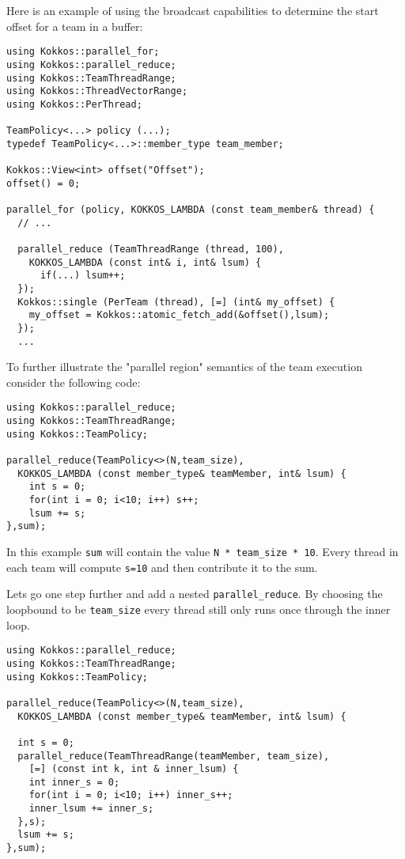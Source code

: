 Here is an example of using the broadcast capabilities to determine the start offset for a team
in a buffer:

\begin{lstlisting}
using Kokkos::parallel_for;
using Kokkos::parallel_reduce;
using Kokkos::TeamThreadRange;
using Kokkos::ThreadVectorRange;
using Kokkos::PerThread;

TeamPolicy<...> policy (...);
typedef TeamPolicy<...>::member_type team_member;

Kokkos::View<int> offset("Offset");
offset() = 0;

parallel_for (policy, KOKKOS_LAMBDA (const team_member& thread) {
  // ...

  parallel_reduce (TeamThreadRange (thread, 100),
    KOKKOS_LAMBDA (const int& i, int& lsum) {
      if(...) lsum++;
  });
  Kokkos::single (PerTeam (thread), [=] (int& my_offset) {
    my_offset = Kokkos::atomic_fetch_add(&offset(),lsum);
  });
  ...
\end{lstlisting}

To further illustrate the "parallel region" semantics of the team execution consider the following code:

\begin{lstlisting}
using Kokkos::parallel_reduce;
using Kokkos::TeamThreadRange;
using Kokkos::TeamPolicy;

parallel_reduce(TeamPolicy<>(N,team_size),
  KOKKOS_LAMBDA (const member_type& teamMember, int& lsum) {
    int s = 0;
    for(int i = 0; i<10; i++) s++;
    lsum += s;
},sum);
\end{lstlisting}

In this example \lstinline{sum} will contain the value \lstinline{N * team_size * 10}.
Every thread in each team will compute \lstinline{s=10} and then contribute it to the sum. 

Lets go one step further and add a nested \lstinline{parallel_reduce}. 
By choosing the loopbound to be \lstinline{team_size} every thread still only runs
once through the inner loop. 

\begin{lstlisting}
using Kokkos::parallel_reduce;
using Kokkos::TeamThreadRange;
using Kokkos::TeamPolicy;
  
parallel_reduce(TeamPolicy<>(N,team_size),
  KOKKOS_LAMBDA (const member_type& teamMember, int& lsum) {
  
  int s = 0;
  parallel_reduce(TeamThreadRange(teamMember, team_size),
    [=] (const int k, int & inner_lsum) {
    int inner_s = 0;
    for(int i = 0; i<10; i++) inner_s++;
    inner_lsum += inner_s;
  },s);
  lsum += s;
},sum);
\end{lstlisting}

